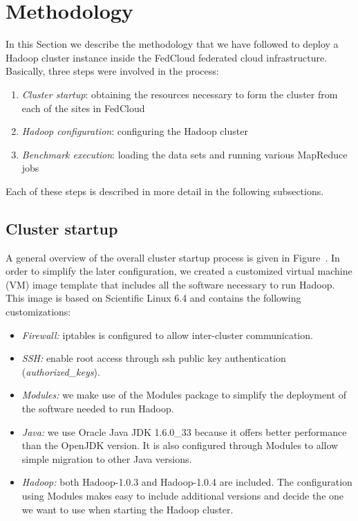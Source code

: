 \documentclass[oribibl]{llncs_Ibergrid2013}
\begin{document}
\section{Methodology}
\label{sect-methodology}
In this Section we describe the methodology that we have followed to deploy a Hadoop cluster instance inside the FedCloud federated cloud infrastructure. Basically, three steps were involved in the process: 
\begin{enumerate}
\item \emph{Cluster startup}: obtaining the resources necessary to form the cluster from each of the sites in FedCloud
\item \emph{Hadoop configuration}: configuring the Hadoop cluster
\item \emph{Benchmark execution}: loading the data sets and running various MapReduce jobs
\end{enumerate}
Each of these steps is described in more detail in the following subsections.

\subsection{Cluster startup}
\label{ssect-cluster}

A general overview of the overall cluster startup process is given in Figure~\cite{fig:client}.
In order to simplify the later configuration, we created a customized virtual machine (VM) image template that includes all the software necessary to run Hadoop. This image is based on Scientific Linux 6.4 and contains the following customizations:
\begin{itemize}
\item \emph{Firewall:} iptables is configured to allow inter-cluster communication.
\item \emph{SSH:} enable root access through ssh public key authentication (\emph{authorized\_keys}).
\item \emph{Modules:} we make use of the Modules package to simplify the deployment of the software needed to run Hadoop.
\item \emph{Java:} we use Oracle Java JDK 1.6.0\_33 because it offers better performance than the OpenJDK version. It is also configured through Modules to allow simple migration to other Java versions.
\item \emph{Hadoop:} both Hadoop-1.0.3 and Hadoop-1.0.4 are included. The configuration using Modules makes easy to include additional versions and decide the one we want to use when starting the Hadoop cluster.
\end{itemize}
\end{document}
